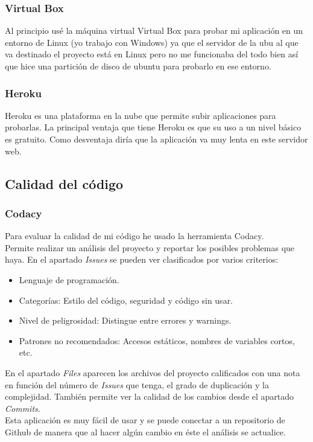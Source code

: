 \subsubsection{Virtual Box}
Al principio usé la máquina virtual Virtual Box para probar mi aplicación en un entorno de Linux (yo trabajo con Windows) ya que el servidor de la ubu al que va destinado el proyecto está en Linux pero no me funcionaba del todo bien así que hice una partición de disco de ubuntu para probarlo en ese entorno. 
\subsubsection{Heroku}
Heroku es una plataforma en la nube que permite subir aplicaciones para probarlas. La principal ventaja que tiene Heroku es que su uso a un nivel básico es gratuito. Como desventaja diría que la aplicación va muy lenta en este servidor web.
\subsection{Calidad del código}
\subsubsection{Codacy}
Para evaluar la calidad de mi código he usado la herramienta Codacy.\\
Permite realizar un análisis del proyecto y reportar los posibles problemas que haya. En el apartado \textit{Issues} se pueden ver clasificados por varios criterios: 
\begin{itemize}
    \item Lenguaje de programación.
    \item Categorías: Estilo del código, seguridad y código sin usar.
    \item Nivel de peligrosidad: Distingue entre errores y warnings.
    \item Patrones no recomendados: Accesos estáticos, nombres de variables cortos, etc.
\end{itemize}
En el apartado \textit{Files} aparecen los archivos del proyecto calificados con una nota en función del número de \textit{Issues} que tenga, el grado de duplicación y la complejidad.
También permite ver la calidad de los cambios desde el apartado \textit{Commits}.\\
Esta aplicación es muy fácil de usar y se puede conectar a un repositorio de Github de manera que al hacer algún cambio en éste el análisis se actualice.\\
